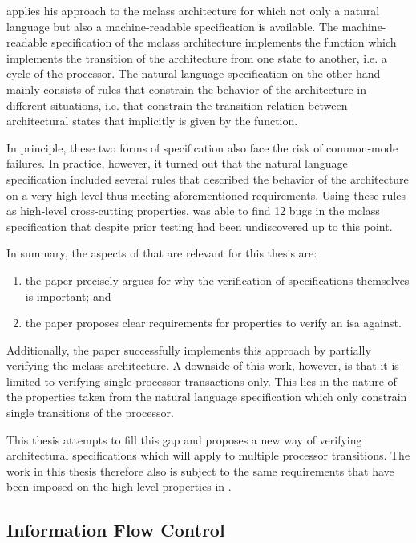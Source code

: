 \citeauthor{Reid17} applies his approach to the \gls{mclass} architecture for which not only a natural language but also a machine-readable specification is available.
The machine-readable specification of the \gls{mclass} architecture implements the function  which implements the transition of the architecture from one state to another, i.e. a cycle of the processor.
The natural language specification on the other hand mainly consists of rules that constrain the behavior of the architecture in different situations, i.e. that constrain the transition relation between architectural states that implicitly is given by the  function.

In principle, these two forms of specification also face the risk of common-mode failures.
In practice, however, it turned out that the natural language specification included several rules that described the behavior of the architecture on a very high-level thus meeting aforementioned requirements.
Using these rules as high-level cross-cutting properties, \citeauthor{Reid17} was able to find 12 bugs in the \gls{mclass} specification that despite prior testing had been undiscovered up to this point.

In summary, the aspects of \cite{Reid17} that are relevant for this thesis are:
\begin{enumerate}[label=\alph*)]
    \item the paper precisely argues for why the verification of specifications themselves is important; and
    \item the paper proposes clear requirements for properties to verify an \gls{isa} against.
\end{enumerate}

Additionally, the paper successfully implements this approach by partially verifying the \gls{mclass} architecture.
A downside of this work, however, is that it is limited to verifying single processor transactions only.
This lies in the nature of the properties taken from the natural language specification which only constrain single transitions of the processor.

This thesis attempts to fill this gap and proposes a new way of verifying architectural specifications which will apply to multiple processor transitions.
The work in this thesis therefore also is subject to the same requirements that have been imposed on the high-level properties in \cite{Reid17}.

\subsection{Information Flow Control}
\label{sec:ifc}

